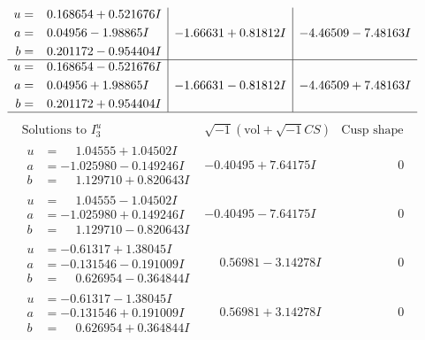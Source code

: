 \documentclass[1p]{elsarticle_modified}
\theoremstyle{definition}
\newcommand{\I}{\sqrt{-1}}
\begin{document}
$$\begin{array}{c|c|c}
\begin{aligned}
u &= \phantom{-}0.168654 + 0.521676 I \\
a &= \phantom{-}0.04956 - 1.98865 I \\
b &= \phantom{-}0.201172 - 0.954404 I\end{aligned}
 & -1.66631 + 0.81812 I & -4.46509 - 7.48163 I \\ \hline\begin{aligned}
u &= \phantom{-}0.168654 - 0.521676 I \\
a &= \phantom{-}0.04956 + 1.98865 I \\
b &= \phantom{-}0.201172 + 0.954404 I\end{aligned}
 & -1.66631 - 0.81812 I & -4.46509 + 7.48163 I\\
 \hline 
 \end{array}$$\newpage$$\begin{array}{c|c|c}  
\text{Solutions to }I^u_{3}& \I (\text{vol} + \sqrt{-1}CS) & \text{Cusp shape}\\
 \hline 
\begin{aligned}
u &= \phantom{-}1.04555 + 1.04502 I \\
a &= -1.025980 - 0.149246 I \\
b &= \phantom{-}1.129710 + 0.820643 I\end{aligned}
 & -0.40495 + 7.64175 I & \phantom{-0.000000 } 0 \\ \hline\begin{aligned}
u &= \phantom{-}1.04555 - 1.04502 I \\
a &= -1.025980 + 0.149246 I \\
b &= \phantom{-}1.129710 - 0.820643 I\end{aligned}
 & -0.40495 - 7.64175 I & \phantom{-0.000000 } 0 \\ \hline\begin{aligned}
u &= -0.61317 + 1.38045 I \\
a &= -0.131546 - 0.191009 I \\
b &= \phantom{-}0.626954 - 0.364844 I\end{aligned}
 & \phantom{-}0.56981 - 3.14278 I & \phantom{-0.000000 } 0 \\ \hline\begin{aligned}
u &= -0.61317 - 1.38045 I \\
a &= -0.131546 + 0.191009 I \\
b &= \phantom{-}0.626954 + 0.364844 I\end{aligned}
 & \phantom{-}0.56981 + 3.14278 I & \phantom{-0.000000 } 0 \\ \hline\begin{aligned}

\end{aligned}
\end{array}$$
\end{document}
